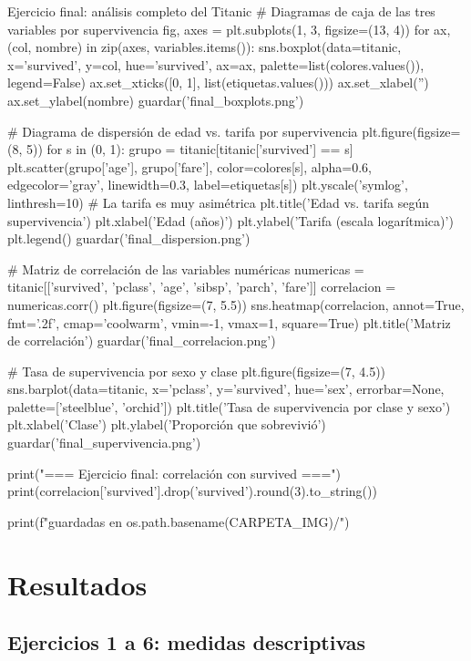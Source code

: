 \documentclass[11pt,letterpaper]{article}
\begin{document}
\begin{codigo}[label=cod:final]{Ejercicio final: análisis completo del Titanic}
# Diagramas de caja de las tres variables por supervivencia
fig, axes = plt.subplots(1, 3, figsize=(13, 4))
for ax, (col, nombre) in zip(axes, variables.items()):
    sns.boxplot(data=titanic, x='survived', y=col, hue='survived', ax=ax,
                palette=list(colores.values()), legend=False)
    ax.set_xticks([0, 1], list(etiquetas.values()))
    ax.set_xlabel('')
    ax.set_ylabel(nombre)
guardar('final_boxplots.png')

# Diagrama de dispersión de edad vs. tarifa por supervivencia
plt.figure(figsize=(8, 5))
for s in (0, 1):
    grupo = titanic[titanic['survived'] == s]
    plt.scatter(grupo['age'], grupo['fare'], color=colores[s], alpha=0.6,
                edgecolor='gray', linewidth=0.3, label=etiquetas[s])
plt.yscale('symlog', linthresh=10)  # La tarifa es muy asimétrica
plt.title('Edad vs. tarifa según supervivencia')
plt.xlabel('Edad (años)')
plt.ylabel('Tarifa (escala logarítmica)')
plt.legend()
guardar('final_dispersion.png')

# Matriz de correlación de las variables numéricas
numericas = titanic[['survived', 'pclass', 'age', 'sibsp', 'parch', 'fare']]
correlacion = numericas.corr()
plt.figure(figsize=(7, 5.5))
sns.heatmap(correlacion, annot=True, fmt='.2f', cmap='coolwarm', vmin=-1, vmax=1,
            square=True)
plt.title('Matriz de correlación')
guardar('final_correlacion.png')

# Tasa de supervivencia por sexo y clase
plt.figure(figsize=(7, 4.5))
sns.barplot(data=titanic, x='pclass', y='survived', hue='sex', errorbar=None,
            palette=['steelblue', 'orchid'])
plt.title('Tasa de supervivencia por clase y sexo')
plt.xlabel('Clase')
plt.ylabel('Proporción que sobrevivió')
guardar('final_supervivencia.png')

print("\n=== Ejercicio final: correlación con survived ===")
print(correlacion['survived'].drop('survived').round(3).to_string())

print(f"\nFiguras guardadas en {os.path.basename(CARPETA_IMG)}/")
\end{codigo}

\section{Resultados}

\subsection{Ejercicios 1 a 6: medidas descriptivas}
\end{document}
